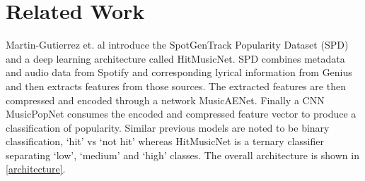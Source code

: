 \documentclass[11pt]{article}
\begin{document}
% 
% 
% 


\section{Related Work}

Martin-Gutierrez et. al \cite{martin-gutierrez_multimodal_2020} introduce the SpotGenTrack Popularity Dataset (SPD) and a deep learning architecture called HitMusicNet. SPD combines metadata and audio data from Spotify and corresponding lyrical information from Genius and then extracts features from those sources. The extracted features are then compressed and encoded through a network MusicAENet. Finally a CNN MusicPopNet consumes the encoded and compressed feature vector to produce a classification of popularity. Similar previous models are noted to be binary classification, ‘hit’ vs ‘not hit’ whereas HitMusicNet is a ternary classifier separating ‘low’, ‘medium’ and ‘high’ classes. The overall architecture is shown in \ref{architecture}.
\end{document}
